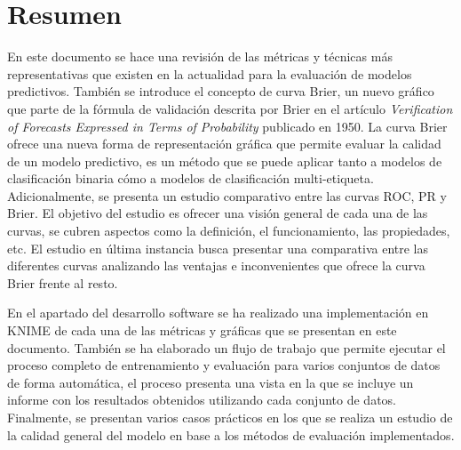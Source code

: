 \thispagestyle{empty}
\section*{Resumen}

En este documento se hace una revisión de las métricas y técnicas más representativas que existen en la actualidad para la evaluación de modelos predictivos.
También se introduce el concepto de curva Brier, un nuevo gráfico que parte de la fórmula de validación descrita por Brier en el artículo \textit{Verification of Forecasts Expressed in Terms of Probability} \cite{brie_1950} publicado en 1950.
La curva Brier ofrece una nueva forma de representación gráfica que permite evaluar la calidad de un modelo predictivo, es un método que se puede aplicar tanto a modelos de clasificación binaria cómo a modelos de clasificación multi-etiqueta. 
Adicionalmente, se presenta un estudio comparativo entre las curvas ROC, PR y Brier. El objetivo del estudio es ofrecer una visión general de cada una de las curvas, se cubren aspectos como la definición, el funcionamiento, las propiedades, etc. El estudio en última instancia busca presentar una comparativa entre las diferentes curvas analizando las ventajas e inconvenientes que ofrece la curva Brier frente al resto.

\bigbreak

En el apartado del desarrollo software se ha realizado una implementación en KNIME de cada una de las métricas y gráficas que se presentan en este documento. 
También se ha elaborado un flujo de trabajo que permite ejecutar el proceso completo de entrenamiento y evaluación para varios conjuntos de datos de forma automática, el proceso presenta una vista en la que se incluye un informe con los resultados obtenidos utilizando cada conjunto de datos. 
Finalmente, se presentan varios casos prácticos en los que se realiza un estudio de la calidad general del modelo en base a los métodos de evaluación implementados.


\clearpage